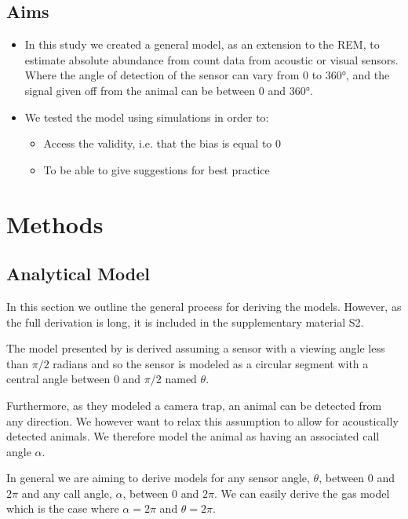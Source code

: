 \documentclass[a4paper,10pt,reqno,oneside]{amsart}
\begin{document}
\subsection{Aims}

\begin{itemize}
\item  In this study we created a general model, as an extension to the REM, to estimate absolute abundance from count data from acoustic or visual sensors. Where the angle of detection of the sensor can vary from 0 to 360°, and the signal given off from the animal can be between 0 and 360°.
\item  We tested the model using simulations in order to:
\begin{itemize}
\item Access the validity, i.e. that the bias is equal to 0
\item  To be able to give suggestions for best practice
\end{itemize}
\end{itemize}


\section{Methods}

\subsection{Analytical Model}

In this section we outline the general process for deriving the models. However, as the full derivation is long, it is included in the supplementary material S2.

The model presented by \citep{rowcliffe2008estimating} is derived assuming a sensor with a viewing angle less than $\pi/2$ radians and so the sensor is modeled as a circular segment with a central angle between 0 and  $\pi/2$ named  $\theta$.

Furthermore, as they modeled a camera trap, an animal can be detected from any direction. We however want to relax this assumption to allow for acoustically detected animals. We therefore model the animal as having an associated call angle $\alpha$.

In general we are aiming to derive models for any sensor angle, $ \theta$, between 0 and $2\pi$ and any call angle, $ \alpha$, between 0 and $2\pi$. We can easily derive the gas model which is the case where $ \alpha =  2\pi$ and $ \theta =  2\pi$.
\end{document}
